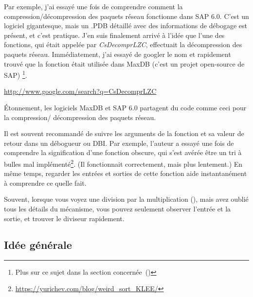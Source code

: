 
Par exemple, j'ai essayé une fois de comprendre comment la compression/décompression
des paquets réseau fonctionne dans SAP 6.0.
C'est un logiciel gigantesque, mais un .\gls{PDB} détaillé avec des informations
de débogage est présent, et c'est pratique.
J'en suis finalement arrivé à l'idée que l'une des fonctions, qui était appelée par
\emph{CsDecomprLZC}, effectuait la décompression des paquets réseau.
Immédiatement, j'ai essayé de googler le nom et rapidement trouvé que la fonction
était utilisée dans MaxDB (c'est un projet open-source de SAP)
\footnote{Plus sur ce sujet dans la section concernée~()}.

\url{http://www.google.com/search?q=CsDecomprLZC}

Étonnement, les logiciels MaxDB et SAP 6.0 partagent du code comme ceci pour la compression/
décompression des paquets réseau.



Il est souvent recommandé de suivre les arguments de la fonction et sa valeur de
retour dans un débogueur ou \ac{DBI}.
Par exemple, l'auteur a essayé une fois de comprendre la signification d'une fonction
obscure, qui s'est avérée être un tri à bulles mal implémenté\footnote{\url{https://yurichev.com/blog/weird_sort_KLEE/}}.
(Il fonctionnait correctement, mais plus lentement.)
En même temps, regarder les entrées et sorties de cette fonction aide instantanément
à comprendre ce quelle fait.

Souvent, lorsque vous voyez une division par la multiplication (),
mais avez oublié tous les détails du mécanisme, vous pouvez seulement observer l'entrée
et la sortie, et trouver le diviseur rapidement.














\subsection{Idée générale}

